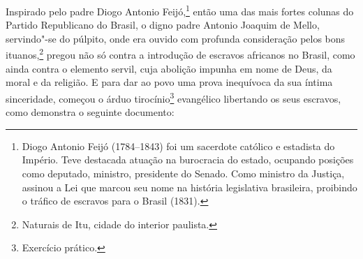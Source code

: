 Inspirado pelo padre Diogo Antonio Feijó,\footnote{Diogo Antonio Feijó \label{feijo}
  (1784--1843) foi um sacerdote católico e estadista do Império. Teve
  destacada atuação na burocracia do estado, ocupando posições como
  deputado, ministro, presidente do Senado. Como ministro da Justiça,
  assinou a Lei que marcou seu nome na história legislativa brasileira,
  proibindo o tráfico de escravos para o Brasil (1831).} então uma das
mais fortes colunas do Partido Republicano do Brasil, o digno padre
Antonio Joaquim de Mello, servindo"-se do púlpito, onde era ouvido com
profunda consideração pelos bons ituanos,\footnote{Naturais de Itu,
  cidade do interior paulista.} pregou não só contra a introdução de
escravos africanos no Brasil, como ainda contra o elemento servil, cuja
abolição impunha em nome de Deus, da moral e da religião. E para dar ao
povo uma prova inequívoca da sua íntima sinceridade, começou o árduo
tirocínio\footnote{Exercício prático.} evangélico libertando os seus
escravos, como demonstra o seguinte documento:

